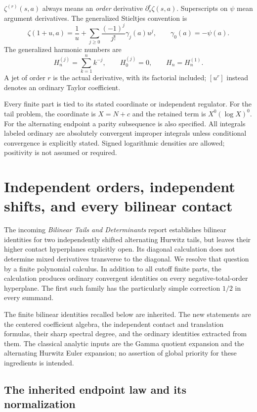 \documentclass[11pt,letterpaper]{article}
\numberwithin{equation}{section}
\theoremstyle{definition}
\theoremstyle{remark}
\begin{document}
\(\zeta^{(r)}(s,a)\) always means an \emph{order} derivative
\(\partial_s^r\zeta(s,a)\). Superscripts on \(\psi\) mean argument
derivatives. The generalized Stieltjes convention is
\[
 \zeta(1+u,a)=\frac1u+
   \sum_{j\ge0}\frac{(-1)^j}{j!}\gamma_j(a)u^j,
 \qquad \gamma_0(a)=-\psi(a).
\]
The generalized harmonic numbers are
\[
 H_n^{(j)}=\sum_{k=1}^{n}k^{-j},\qquad H_0^{(j)}=0,
 \qquad H_n=H_n^{(1)}.
\]
A jet of order \(r\) is the actual derivative, with its factorial included;
\([u^r]\) instead denotes an ordinary Taylor coefficient.

Every finite part is tied to its stated coordinate or independent
regulator. For the tail problem, the coordinate is \(X=N+c\) and the
retained term is \(X^0(\log X)^0\). For the alternating endpoint a parity
subsequence is also specified. All integrals labeled ordinary are
absolutely convergent improper integrals unless conditional convergence is
explicitly stated. Signed logarithmic densities are allowed; positivity
is not assumed or required.



\section{Independent orders, independent shifts, and every bilinear contact}
\label{ct:section}

The incoming \emph{Bilinear Tails and Determinants} report establishes
bilinear identities for two independently shifted alternating Hurwitz tails\cite{ProveItBilinear},
but leaves their higher contact hyperplanes explicitly open. Its diagonal
calculation does not determine mixed derivatives transverse to the diagonal.
We resolve that question by a finite polynomial calculus. In addition to
all cutoff finite parts, the calculation produces ordinary convergent
identities on every negative-total-order hyperplane. The first such family
has the particularly simple correction $1/2$ in every summand.

The finite bilinear identities recalled below are inherited. The new
statements are the centered coefficient algebra, the independent contact
and translation formulas, their sharp spectral degree, and the ordinary
identities extracted from them. The classical analytic inputs are the
Gamma quotient expansion and the alternating Hurwitz Euler expansion;
no assertion of global priority for these ingredients is intended.

\subsection{The inherited endpoint law and its normalization}
\end{document}
